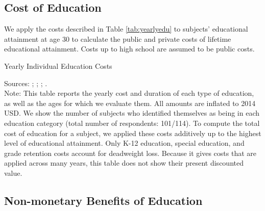 \subsection{Cost of Education}
\noindent We apply the costs described in Table \ref{tab:yearlyedu} to subjects' educational attainment at age 30 to calculate the public and private costs of lifetime educational attainment. Costs up to high school are assumed to be public costs. \\

\begin{table}[H]
\caption{Yearly Individual Education Costs} \label{tab:yearlyedu}
\centering
\begin{adjustbox}{max width=\textwidth}
\begin{threeparttable}
\footnotesize

\centering
\begin{tablenotes}%
\scriptsize
\item Sources: \citet{Snyder_Willow_2012_BOOK_NCES}; \citet{Hoenack_Weiler_1975_JHR}; \cite{Dhanidina_Griffith_1975_AEQ}; \cite{Freeman_1974_Occupational-Training_RES}. \\
 Note: This table reports the yearly cost and duration of each type of education, as well as the ages for which we evaluate them.  All amounts are inflated to 2014 USD.
We show the number of subjects who identified themselves as being in each education category (total number of respondents: 101/114). To compute the total cost of education for a subject, we applied these costs additively up to the highest level of educational attainment. Only K-12 education, special  education, and grade retention costs account for deadweight loss. Because it gives costs that are applied across many years, this table does not show their present discounted value.
\end{tablenotes}
\end{threeparttable}
\end{adjustbox}
\end{table}

\subsection{Non-monetary Benefits of Education}

